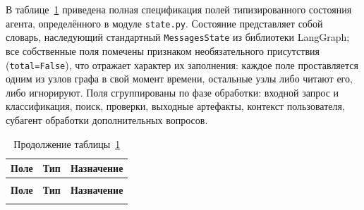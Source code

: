 
В таблице~\ref{tab:state-fields} приведена полная спецификация полей типизированного состояния агента, определённого в модуле \texttt{state.py}. Состояние представляет собой словарь, наследующий стандартный \texttt{MessagesState} из библиотеки LangGraph; все собственные поля помечены признаком необязательного присутствия (\texttt{total=False}), что отражает характер их заполнения: каждое поле проставляется одним из узлов графа в свой момент времени, остальные узлы либо читают его, либо игнорируют. Поля сгруппированы по фазе обработки: входной запрос и классификация, поиск, проверки, выходные артефакты, контекст пользователя, субагент обработки дополнительных вопросов.

\landscapestart
\footnotesize
\begin{longtable}[H]{|>{\raggedright\arraybackslash}p{90mm}|>{\raggedright\arraybackslash}p{38mm}|>{\raggedright\arraybackslash}p{195mm}|}
    \caption{Поля состояния ContractAgentState}\label{tab:state-fields} \\ \hline
    \textbf{Поле} & \textbf{Тип} & \textbf{Назначение} \\ \hline
    \endfirsthead
    \caption*{Продолжение таблицы~\ref{tab:state-fields}} \\ \hline
    \textbf{Поле} & \textbf{Тип} & \textbf{Назначение} \\ \hline
    \endhead
    \hline
    \endfoot
    \hline
    \endlastfoot


\end{longtable}

